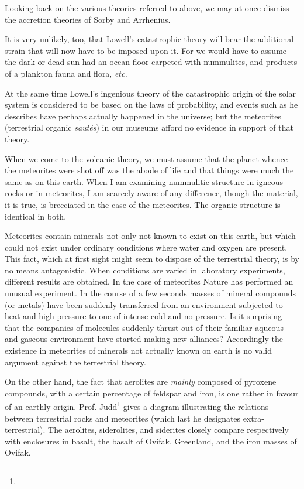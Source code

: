 \documentclass[a4paper, 12pt, oneside]{article}
\begin{document}
Looking back on the various theories referred to above, we may at once dismiss the accretion theories of Sorby and Arrhenius.

It is very unlikely, too, that Lowell's catastrophic theory will bear the additional strain that will now have to be imposed upon it. For we would have to assume the dark or dead sun had an ocean floor carpeted with nummulites, and products of a plankton fauna and flora, \emph{etc.}

At the same time Lowell's ingenious theory of the catastrophic origin of the solar system is considered to be based on the laws of probability, and events such as he describes have perhaps actually happened in the universe; but the meteorites (terrestrial organic \emph{sautés}) in our museums afford no evidence in support of that theory.

When we come to the volcanic theory, we must assume that the planet whence the meteorites were shot off was the abode of life and that things were much the same as on this earth. When I am examining nummulitic structure in igneous rocks or in meteorites, I am scarcely aware of any difference, though the material, it is true, is brecciated in the case of the meteorites. The organic structure is identical in both.

Meteorites contain minerals not only not known to exist on this earth, but which could not exist under ordinary conditions where water and oxygen are present. This fact, which at first sight might seem to dispose of the terrestrial theory, is by no means antagonistic. When conditions are varied in laboratory experiments, different results are obtained. In the case of meteorites Nature has performed an unusual experiment. In the course of a few seconds masses of mineral compounds (or metals) have been suddenly transferred from an environment subjected to heat and high pressure to one of intense cold and no pressure. Is it surprising that the companies of molecules suddenly thrust out of their familiar aqueous and gaseous environment have started making new alliances? Accordingly the existence in meteorites of minerals not actually known on earth is no valid argument against the terrestrial theory.

On the other hand, the fact that aerolites are \emph{mainly} composed of pyroxene compounds, with a certain percentage of feldspar and iron, is one rather in favour of an earthly origin. Prof. Judd\footnote{} gives a diagram illustrating the relations between terrestrial rocks and meteorites (which last he designates extra-terrestrial). The aerolites, siderolites, and siderites closely compare respectively with enclosures in basalt, the basalt of Ovifak, Greenland, and the iron masses of Ovifak.
\end{document}
